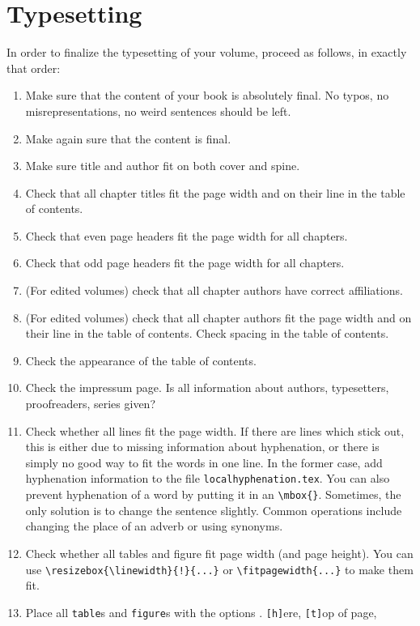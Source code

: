 \chapter{Typesetting}
In order to finalize the typesetting of your volume, proceed as follows, in exactly that order:

\begin{enumerate}
 \item Make sure that the content of your book is absolutely final. No typos, no misrepresentations, no weird sentences should be left.
 \item Make again sure that the content is final. 
 \item Make sure title and author fit on both cover and spine. 
 \item Check that all chapter titles fit the page width and on their line in the table of contents. 
 \item Check that even page headers fit the page width for all chapters.
 \item Check that odd page headers fit the page width for all chapters.
 \item (For edited volumes) check that all chapter authors have correct affiliations.
 \item (For edited volumes) check that all chapter authors fit the page width and on their line in the table of contents. Check spacing in the table of contents. 
 \item Check the appearance of the table of contents.
 \item Check the impressum page. Is all information about authors, typesetters, proofreaders, series given?
 \item Check whether all lines fit the page width. If there are lines which stick out, this is either due to missing information about hyphenation, or there is simply no good way to fit the words in one line. In the former case, add hyphenation information to the file \verb+localhyphenation.tex+. You can also prevent hyphenation of a word by putting it in an \verb+\mbox{}+. Sometimes, the only solution is to change the sentence slightly. Common operations include changing the place of an adverb or using synonyms.
 \item Check whether all tables and figure fit page width (and page height). You can use \verb+\resizebox{\linewidth}{!}{...}+ or \verb+\fitpagewidth{...}+  to make them fit.
 \item Place all \verb+table+s and \verb+figure+s with the options .
\texttt{[h]}ere, 
\texttt{[t]}op of page, 

\end{enumerate}
